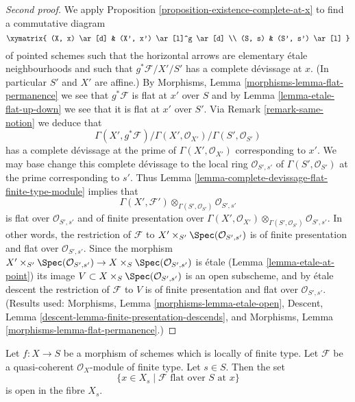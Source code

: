 \begin{proof}[Second proof]
We apply
Proposition \ref{proposition-existence-complete-at-x}
to find a commutative diagram
$$
\xymatrix{
(X, x) \ar[d] & (X', x') \ar[l]^g \ar[d] \\
(S, s) & (S', s') \ar[l]
}
$$
of pointed schemes such that the horizontal
arrows are elementary \'etale neighbourhoods
and such that $g^*\mathcal{F}/X'/S'$ has a complete
d\'evissage at $x$.
(In particular $S'$ and $X'$ are affine.) By
Morphisms, Lemma \ref{morphisms-lemma-flat-permanence}
we see that $g^*\mathcal{F}$ is flat at $x'$ over $S$ and by
Lemma \ref{lemma-etale-flat-up-down}
we see that it is flat at $x'$ over $S'$. Via
Remark \ref{remark-same-notion}
we deduce that
$$
\Gamma(X', g^*\mathcal{F})/
\Gamma(X', \mathcal{O}_{X'})/
\Gamma(S', \mathcal{O}_{S'})
$$
has a complete d\'evissage at the prime of $\Gamma(X', \mathcal{O}_{X'})$
corresponding to $x'$. We may base change this complete
d\'evissage to the local ring $\mathcal{O}_{S', s'}$
of $\Gamma(S', \mathcal{O}_{S'})$ at the prime corresponding to
$s'$. Thus
Lemma \ref{lemma-complete-devissage-flat-finite-type-module}
implies that
$$
\Gamma(X', \mathcal{F}')
\otimes_{\Gamma(S', \mathcal{O}_{S'})}
\mathcal{O}_{S', s'}
$$
is flat over $\mathcal{O}_{S', s'}$ and of finite presentation over
$\Gamma(X', \mathcal{O}_{X'})
\otimes_{\Gamma(S', \mathcal{O}_{S'})} \mathcal{O}_{S', s'}$.
In other words, the restriction of $\mathcal{F}$ to
$X' \times_{S'} \Spec(\mathcal{O}_{S', s'})$
is of finite presentation and flat over $\mathcal{O}_{S', s'}$.
Since the morphism
$X' \times_{S'} \Spec(\mathcal{O}_{S', s'})
\to X \times_S \Spec(\mathcal{O}_{S', s'})$
is \'etale
(Lemma \ref{lemma-etale-at-point})
its image $V \subset X \times_S \Spec(\mathcal{O}_{S', s'})$
is an open subscheme, and by \'etale descent the restriction
of $\mathcal{F}$ to $V$ is of finite presentation and flat over
$\mathcal{O}_{S', s'}$. (Results used:
Morphisms, Lemma \ref{morphisms-lemma-etale-open},
Descent, Lemma \ref{descent-lemma-finite-presentation-descends}, and
Morphisms, Lemma \ref{morphisms-lemma-flat-permanence}.)
\end{proof}

\begin{lemma}
\label{lemma-open-in-fibre-where-flat}
Let $f : X \to S$ be a morphism of schemes which is locally of finite type.
Let $\mathcal{F}$ be a quasi-coherent $\mathcal{O}_X$-module of finite type.
Let $s \in S$. Then the set
$$
\{x \in X_s \mid \mathcal{F} \text{ flat over }S\text{ at }x\}
$$
is open in the fibre $X_s$.
\end{lemma}

